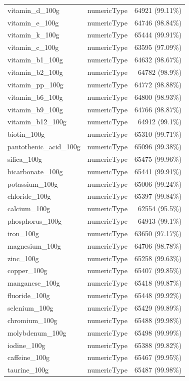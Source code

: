 \documentclass[11pt]{article}
\begin{document}
\begin{center}
\begin{longtable}{|l|c|r|}
vitamin\_d\_100g& numericType& 64921 (99.11\%)\\
vitamin\_e\_100g& numericType& 64746 (98.84\%)\\
vitamin\_k\_100g& numericType& 65444 (99.91\%)\\
vitamin\_c\_100g& numericType& 63595 (97.09\%)\\
vitamin\_b1\_100g& numericType& 64632 (98.67\%)\\
vitamin\_b2\_100g& numericType& 64782 (98.9\%)\\
vitamin\_pp\_100g& numericType& 64772 (98.88\%)\\
vitamin\_b6\_100g& numericType& 64800 (98.93\%)\\
vitamin\_b9\_100g& numericType& 64766 (98.87\%)\\
vitamin\_b12\_100g& numericType& 64912 (99.1\%)\\
biotin\_100g& numericType& 65310 (99.71\%)\\
pantothenic\_acid\_100g& numericType& 65096 (99.38\%)\\
silica\_100g& numericType& 65475 (99.96\%)\\
bicarbonate\_100g& numericType& 65441 (99.91\%)\\
potassium\_100g& numericType& 65006 (99.24\%)\\
chloride\_100g& numericType& 65397 (99.84\%)\\
calcium\_100g& numericType& 62554 (95.5\%)\\
phosphorus\_100g& numericType& 64913 (99.1\%)\\
iron\_100g& numericType& 63650 (97.17\%)\\
magnesium\_100g& numericType& 64706 (98.78\%)\\
zinc\_100g& numericType& 65258 (99.63\%)\\
copper\_100g& numericType& 65407 (99.85\%)\\
manganese\_100g& numericType& 65418 (99.87\%)\\
fluoride\_100g& numericType& 65448 (99.92\%)\\
selenium\_100g& numericType& 65429 (99.89\%)\\
chromium\_100g& numericType& 65488 (99.98\%)\\
molybdenum\_100g& numericType& 65498 (99.99\%)\\
iodine\_100g& numericType& 65388 (99.82\%)\\
caffeine\_100g& numericType& 65467 (99.95\%)\\
taurine\_100g& numericType& 65487 (99.98\%)\\

\end{longtable}
\end{center}
\end{document}
